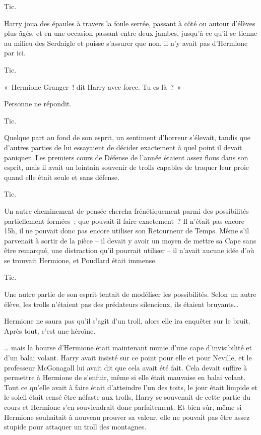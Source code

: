 Tic.

Harry joua des épaules à travers la foule serrée, passant à côté ou autour d'élèves plus âgés, et en une occasion passant entre deux jambes, jusqu'à ce qu'il se tienne au milieu des Serdaigle et puisse s'assurer que non, il n'y avait pas d'Hermione par ici.

Tic.

«~Hermione Granger~! dit Harry avec force. Tu es là~?~»

Personne ne répondit.

Tic.

Quelque part au fond de son esprit, un sentiment d'horreur s'élevait, tandis que d'autres parties de lui essayaient de décider exactement à quel point il devait paniquer. Les premiers cours de Défense de l'année étaient assez flous dans son esprit, mais il avait un lointain souvenir de trolls capables de traquer leur proie quand elle était seule et sans défense.

Tic.

Un autre cheminement de pensée chercha frénétiquement parmi des possibilités partiellement formées~; que pouvait-il faire exactement~? Il n'était pas encore 15h, il ne pouvait donc pas encore utiliser son Retourneur de Temps. Même s'il parvenait à sortir de la pièce -- il devait y avoir un moyen de mettre sa Cape sans être remarqué, une distraction qu'il pourrait utiliser -- il n'avait aucune idée d'où se trouvait Hermione, et Poudlard était immense.

Tic.

Une autre partie de son esprit tentait de modéliser les possibilités. Selon un autre élève, les trolls n'étaient pas des prédateurs silencieux, ils étaient bruyants…

Hermione ne saura pas qu'il s'agit d'un troll, alors elle ira enquêter sur le bruit. Après tout, c'est une héroïne.

… mais la bourse d'Hermione était maintenant munie d'une cape d'invisibilité et d'un balai volant. Harry avait insisté sur ce point pour elle et pour Neville, et le professeur McGonagall lui avait dit que cela avait été fait. Cela devait suffire à permettre à Hermione de s'enfuir, même si elle était mauvaise en balai volant. Tout ce qu'elle avait à faire était d'atteindre l'un des toits, le jour était limpide et le soleil était censé être néfaste aux trolls, Harry se souvenait de cette partie du cours et Hermione s'en souviendrait donc parfaitement. Et bien sûr, même si Hermione souhaitait à nouveau prouver sa valeur, elle ne pouvait pas être assez stupide pour attaquer un troll des montagnes.

